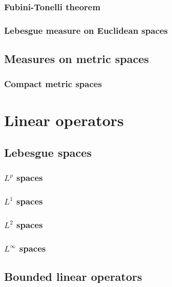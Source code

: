 \documentclass{../note}
\begin{document}
\section{Fubini-Tonelli theorem}
\section{Lebesgue measure on Euclidean spaces}


\chapter{Measures on metric spaces}


\section{Compact metric spaces}









\part{Linear operators}



\chapter{Lebesgue spaces}
\section{$L^p$ spaces}
\section{$L^1$ spaces}
\section{$L^2$ spaces}
\section{$L^\infty$ spaces}








\chapter{Bounded linear operators}
\end{document}
